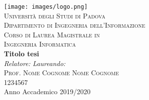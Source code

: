 



\begin{titlepage}
\begin{center}
\texttt{[image: images/logo.png]}\\

\vspace{0.8cm}
\textsc{\LARGE Universit\`{a} degli Studi di Padova}\\
\vspace{0.45cm}
\textsc{\large Dipartimento di Ingegneria dell'Informazione}\\
\vspace{0.4cm}
\textsc{\large Corso di Laurea Magistrale in}\\
\textsc{\large Ingegneria Informatica}\\
\vfill
{ \LARGE \bfseries Titolo tesi
}\\
\vfill
\textit{\large Relatore:} \hfill \textit{\large Laureando:}\\
\textsc{\large Prof. Nome Cognome} \hfill \textsc{Nome Cognome}\\
\hfill \textsc{1234567}\\

\vfill
{\large Anno Accademico 2019/2020}
\end{center}
\end{titlepage}

\thispagestyle{empty} %
\cleardoublepage

\thispagestyle{empty}

\clearpage{\pagestyle{plain}\cleardoublepage}




